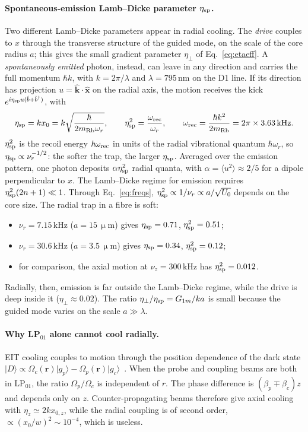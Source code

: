 \documentclass[11pt,a4paper]{article}
\newcommand{\micrometre}{\upmu m}\newcommand{\microkelvin}{\upmu K}
\newcommand{\SI}[2]{\ensuremath{#1\,\mathrm{#2}}}
\newcommand{\ket}[1]{|#1\rangle}
\newcommand{\gp}{\ket{g_p}}
\newcommand{\gc}{\ket{g_c}}
\newcommand{\Om}{\Omega}
\newcommand{\etaeff}{\eta_{\perp}}
\begin{document}
\paragraph{Spontaneous-emission Lamb--Dicke parameter $\eta_{\rm sp}$.} Two different Lamb--Dicke parameters appear in radial cooling. The \emph{drive} couples to $x$ through the transverse structure of the guided mode, on the scale of the core radius $a$; this gives the small gradient parameter $\etaeff$ of Eq.~\eqref{eq:etaeff}. A \emph{spontaneously emitted} photon, instead, can leave in any direction and carries the full momentum $\hbar k$, with $k=2\pi/\lambda$ and $\lambda=\SI{795}{nm}$ on the D1 line. If its direction has projection $u=\hat{\mathbf k}\cdot\hat{\mathbf x}$ on the radial axis, the motion receives the kick $e^{i\eta_{\rm sp}u(\hat b+\hat b^\dagger)}$, with
\begin{equation}
  \eta_{\rm sp}=kx_0=k\sqrt{\frac{\hbar}{2m_{\rm Rb}\omega_r}},\qquad
  \eta_{\rm sp}^2=\frac{\omega_{\rm rec}}{\omega_r},\qquad
  \omega_{\rm rec}=\frac{\hbar k^2}{2m_{\rm Rb}}=2\pi\times\SI{3.63}{kHz}.
  \label{eq:etasp}
\end{equation}
$\eta_{\rm sp}^2$ is the recoil energy $\hbar\omega_{\rm rec}$ in units of the radial vibrational quantum $\hbar\omega_r$, so $\eta_{\rm sp}\propto\nu_r^{-1/2}$: the softer the trap, the larger $\eta_{\rm sp}$. Averaged over the emission pattern, one photon deposits $\alpha\eta_{\rm sp}^2$ radial quanta, with $\alpha=\langle u^2\rangle\approx2/5$ for a dipole perpendicular to $x$. The Lamb--Dicke regime for emission requires $\eta_{\rm sp}^2(2n+1)\ll1$. Through Eq.~\eqref{eq:freqs}, $\eta_{\rm sp}^2\propto1/\nu_r\propto a/\sqrt{U_0}$ depends on the core size. The radial trap in a fibre is soft:
\begin{itemize}
\item $\nu_r=\SI{7.15}{kHz}$ ($a=\SI{15}{\micrometre}$) gives $\eta_{\rm sp}=0.71$, $\eta_{\rm sp}^2=0.51$;
\item $\nu_r=\SI{30.6}{kHz}$ ($a=\SI{3.5}{\micrometre}$) gives $\eta_{\rm sp}=0.34$, $\eta_{\rm sp}^2=0.12$;
\item for comparison, the axial motion at $\nu_z=\SI{300}{kHz}$ has $\eta_{\rm sp}^2=0.012$.
\end{itemize}
Radially, then, emission is far outside the Lamb--Dicke regime, while the drive is deep inside it ($\etaeff\approx0.02$). The ratio $\etaeff/\eta_{\rm sp}=G_{1m}/ka$ is small because the guided mode varies on the scale $a\gg\lambda$.

\paragraph{Why LP$_{01}$ alone cannot cool radially.} EIT cooling couples to motion through the position dependence of the dark state $\ket{D}\propto\Om_c(\mathbf r)\gp-\Om_p(\mathbf r)\gc$~\cite{morigi2000,morigi2003}. When the probe and coupling beams are both in LP$_{01}$, the ratio $\Om_p/\Om_c$ is independent of $r$. The phase difference is $(\beta_p\mp\beta_c)z$ and depends only on $z$. Counter-propagating beams therefore give axial cooling with $\eta_z\simeq2kx_{0,z}$, while the radial coupling is of second order, $\propto(x_0/w)^2\sim10^{-4}$, which is useless.
\end{document}
